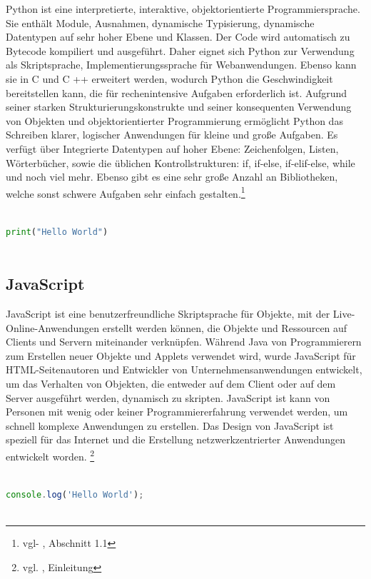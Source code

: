 Python ist eine interpretierte, interaktive, objektorientierte Programmiersprache. Sie enthält Module, Ausnahmen, dynamische Typisierung, dynamische Datentypen auf sehr hoher Ebene und Klassen. Der Code wird automatisch zu Bytecode kompiliert und ausgeführt. Daher eignet sich Python zur Verwendung als Skriptsprache, Implementierungssprache für Webanwendungen. Ebenso kann sie in C und C ++ erweitert werden, wodurch Python die Geschwindigkeit bereitstellen kann, die für rechenintensive Aufgaben erforderlich ist. Aufgrund seiner starken Strukturierungskonstrukte und seiner konsequenten Verwendung von Objekten und objektorientierter Programmierung ermöglicht Python das Schreiben klarer, logischer Anwendungen für kleine und große Aufgaben. Es verfügt über Integrierte Datentypen auf hoher Ebene: Zeichenfolgen, Listen, Wörterbücher, sowie die üblichen Kontrollstrukturen: if, if-else, if-elif-else, while und noch viel mehr. Ebenso gibt es eine sehr große Anzahl an Bibliotheken, welche sonst schwere Aufgaben sehr einfach gestalten.\footnote{vgl- \autocite{python}, Abschnitt 1.1}

\begin{lstlisting}[language=Python, caption={Hello World Programm in Pyhton},captionpos=b]
	
print("Hello World")
	
\end{lstlisting}

\subsection{JavaScript}

JavaScript ist eine benutzerfreundliche Skriptsprache für Objekte, mit der Live-Online-Anwendungen erstellt werden können, die Objekte und Ressourcen auf Clients und Servern miteinander verknüpfen. Während Java von Programmierern zum Erstellen neuer Objekte und Applets verwendet wird, wurde JavaScript für HTML-Seitenautoren und Entwickler von Unternehmensanwendungen entwickelt, um das Verhalten von Objekten, die entweder auf dem Client oder auf dem Server ausgeführt werden, dynamisch zu skripten. JavaScript ist kann von Personen mit wenig oder keiner Programmiererfahrung verwendet werden, um schnell komplexe Anwendungen zu erstellen. Das Design von JavaScript ist speziell für das Internet und die Erstellung netzwerkzentrierter Anwendungen entwickelt worden. \footnote{vgl. \cite{javascript}, Einleitung}

\begin{lstlisting}[language=JavaScript, caption={Hello World Programm in JavaScript},captionpos=b]
	
console.log('Hello World');
	
\end{lstlisting}

\newpage


